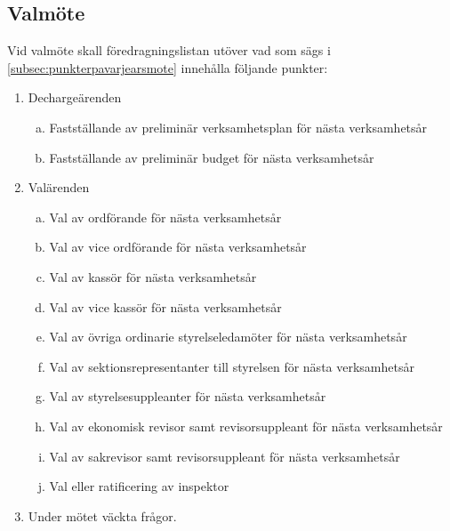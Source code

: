 \clearpage
        \subsection{Valmöte}
        \label{subsec:valmote}
                Vid valmöte skall föredragningslistan utöver vad som sägs i \ref{subsec:punkterpavarjearsmote} innehålla följande punkter:
                \begin{enumerate}[1.]
                \setlength{\itemsep}{0.0cm}
                \setlength{\parskip}{0.0cm}
                \setcounter{enumi}{3}
                        \item Dechargeärenden
                        \begin{enumerate}[a.]
                        \setlength{\itemsep}{0.0cm}
                        \setlength{\parskip}{0.0cm}
                                \item Fastställande av preliminär verksamhetsplan för nästa verksamhetsår
                                \item Fastställande av preliminär budget för nästa verksamhetsår
                                \end{enumerate}
                        \item Valärenden
                        \begin{enumerate}[a.]
                        \setlength{\itemsep}{0.0cm}
                        \setlength{\parskip}{0.0cm}
                                \item Val av ordförande för nästa verksamhetsår
                                \item Val av vice ordförande för nästa verksamhetsår
                                \item Val av kassör för nästa verksamhetsår
                                \item Val av vice kassör för nästa verksamhetsår
                                \item Val av övriga ordinarie styrelseledamöter för nästa verksamhetsår
                                \item Val av sektionsrepresentanter till styrelsen för nästa verksamhetsår
                                \item Val av styrelsesuppleanter för nästa verksamhetsår
                                \item Val av ekonomisk revisor samt revisorsuppleant för nästa verksamhetsår
                                \item Val av sakrevisor samt revisorsuppleant för nästa verksamhetsår
                                \item Val eller ratificering av inspektor
                                \end{enumerate}
                \setcounter{enumi}{5}
                        \item Under mötet väckta frågor.
                        \end{enumerate}


